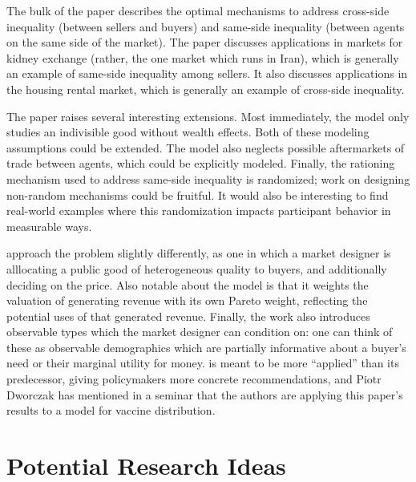 \documentclass[JEL]{AEA}
\begin{document}
The bulk of the paper describes the optimal mechanisms to address cross-side inequality (between sellers and buyers) and same-side inequality (between agents on the same side of the market). The paper discusses applications in markets for kidney exchange (rather, the one market which runs in Iran), which is generally an example of same-side inequality among sellers. It also discusses applications in the housing rental market, which is generally an example of cross-side inequality.


The paper raises several interesting extensions. Most immediately, the model only studies an indivisible good without wealth effects. Both of these modeling assumptions could be extended. The model also neglects possible aftermarkets of trade between agents, which could be explicitly modeled. Finally, the rationing mechanism used to address same-side inequality is randomized; work on designing non-random mechanisms could be fruitful. It would also be interesting to find real-world examples where this randomization impacts participant behavior in measurable ways.


\cite{akbarpour-2020} approach the problem slightly differently, as one in which a market designer is alllocating a public good of heterogeneous quality to buyers, and additionally deciding on the price. Also notable about the \cite{akbarpour-2020} model is that it weights the valuation of generating revenue with its own Pareto weight, reflecting the potential uses of that generated revenue. Finally, the work also introduces observable types which the market designer can condition on: one can think of these as observable demographics which are partially informative about a buyer's need or their marginal utility for money. \cite{akbarpour-2020} is meant to be more ``applied'' than its predecessor, giving policymakers more concrete recommendations, and Piotr Dworczak has mentioned in a seminar that the authors are applying this paper's results to a model for vaccine distribution.

\section{Potential Research Ideas}
\label{sec:ideas}
\end{document}
